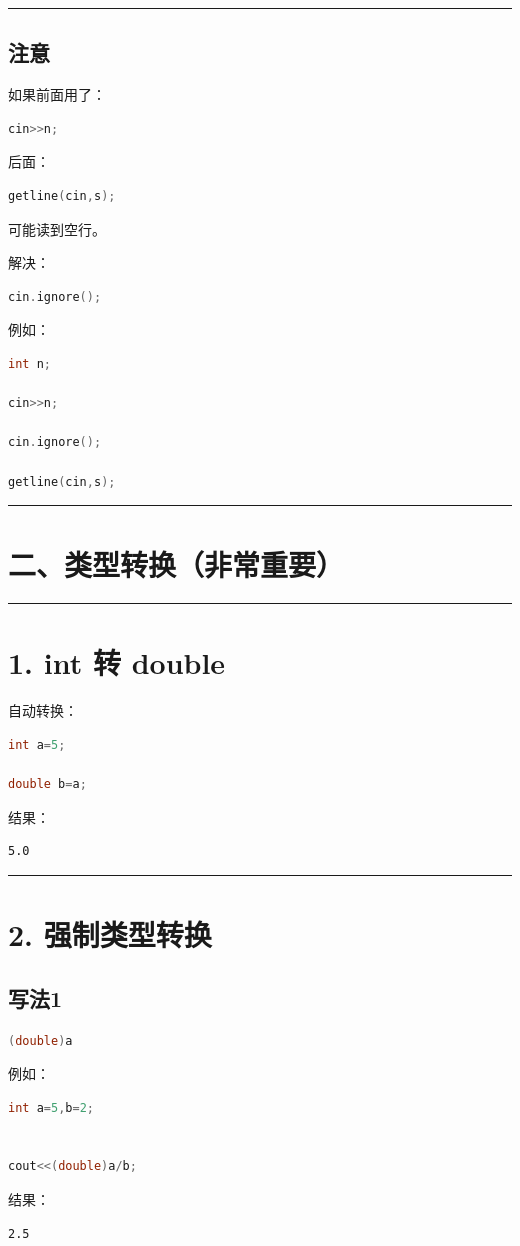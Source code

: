 \documentclass[10pt,twocolumn]{extarticle}
\begin{document}
\noindent\rule{\linewidth}{0.4pt}

\subsection{注意}
如果前面用了：
\begin{lstlisting}[language=C++]
cin>>n;
\end{lstlisting}
后面：
\begin{lstlisting}[language=C++]
getline(cin,s);
\end{lstlisting}
可能读到空行。

解决：
\begin{lstlisting}[language=C++]
cin.ignore();
\end{lstlisting}
例如：
\begin{lstlisting}[language=C++]
int n;

cin>>n;

cin.ignore();

getline(cin,s);
\end{lstlisting}

\noindent\rule{\linewidth}{0.4pt}

\section{二、类型转换（非常重要）}

\noindent\rule{\linewidth}{0.4pt}

\section{1. int 转 double}

自动转换：
\begin{lstlisting}[language=C++]
int a=5;

double b=a;
\end{lstlisting}
结果：
\begin{lstlisting}
5.0
\end{lstlisting}

\noindent\rule{\linewidth}{0.4pt}

\section{2. 强制类型转换}

\subsection{写法1}
\begin{lstlisting}[language=C++]
(double)a
\end{lstlisting}
例如：
\begin{lstlisting}[language=C++]
int a=5,b=2;


cout<<(double)a/b;
\end{lstlisting}
结果：
\begin{lstlisting}
2.5
\end{lstlisting}
\end{document}
